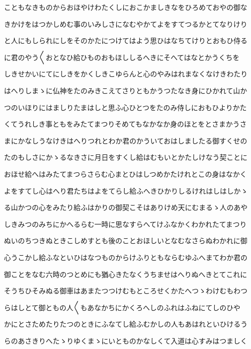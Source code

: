 \documentclass[a4paper,11pt,landscape]{ltjtarticle}
\begin{document}
こともなきものからおほやけわたくしにおこかましきなをひろめておやの御な
\par\medskip
きかけをはつかしめむ事のいみしさになむやかてよをすてつるかとてなりけり
\par\medskip
と人にもしられにしをそのかたにつけてはよう思ひはなちてけりとおもひ侍る
\par\medskip
に君のやう〱おとなひ給ひものおもほししるへきにそへてはなとかうくちを
\par\medskip
しきせかいにてにしきをかくしきこゆらんと心のやみはれまなくなけきわたり
\par\medskip
はへりしまゝに仏神をたのみきこえてさりともかうつたなき身にひかれて山か
\par\medskip
つのいほりにはましりたまはしと思ふ心ひとつをたのみ侍しにおもひよりかた
\par\medskip
くてうれしき事ともをみたてまつりそめてもなかなか身のほとをとさまかうさ
\par\medskip
まにかなしうなけきはへりつれとわか君のかういておはしましたる御すくせの
\par\medskip
たのもしさにかゝるなきさに月日をすくし給はむもいとかたしけなう契ことに
\par\medskip
おほせ給へはみたてまつらさらむ心まとひはしつめかたけれとこの身はなかく
\par\medskip
よをすてし心はへり君たちはよをてらし給ふへきひかりしるけれはしはしかゝ
\par\medskip
る山かつの心をみたり給ふはかりの御契こそはありけめ天にむまるゝ人のあや
\par\medskip
しきみつのみちにかへるらむ一時に思なすらへてけふなかくわかれたてまつり
\par\medskip
ぬいのちつきぬときこしめすとも後のことおほしいとなむなさらぬわかれに御
\par\medskip
心うこかし給ふなといひはなつものからけふりともならむゆふへまてわか君の
\par\medskip
御ことをなむ六時のつとめにも猶心きたなくうちませはへりぬへきとてこれに
\par\medskip
そうちひそみぬる御車はあまたつつけむもところせくかたへつゝわけむもわつ
\par\medskip
らはしとて御ともの人〱もあなかちにかくろへしのふれはふねにてしのひや
\par\medskip
かにとさためたりたつのときにふなてし給ふむかしの人もあはれといひけるう
\par\medskip
らのあさきりへたゝりゆくまゝにいとものかなしくて入道は心すみはつましく
\par\medskip
\end{document}
